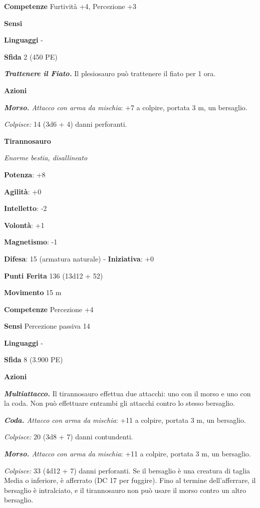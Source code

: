 \begin{multicols}{2}
\textbf{Competenze} Furtività +4, Percezione +3

\textbf{Sensi} 

\textbf{Linguaggi} -

\textbf{Sfida} 2 (450 PE)

\emph{\textbf{Trattenere il Fiato.}} Il plesiosauro può trattenere il
fiato per 1 ora.

\textbf{Azioni}

\emph{\textbf{Morso.} Attacco con arma da mischia}: +7 a colpire,
portata 3 m, un bersaglio.

\emph{Colpisce:} 14 (3d6 + 4) danni perforanti.

\textbf{Tirannosauro}

\emph{Enorme bestia, disallineato}

\textbf{Potenza}: +8

\textbf{Agilità}: +0

\textbf{Intelletto}: -2

\textbf{Volontà}: +1

\textbf{Magnetismo}: -1

\textbf{Difesa}: 15 (armatura naturale) - \textbf{Iniziativa}: +0

\textbf{Punti Ferita} 136 (13d12 + 52)

\textbf{Movimento} 15 m

\textbf{Competenze} Percezione +4

\textbf{Sensi} Percezione passiva 14

\textbf{Linguaggi} -

\textbf{Sfida} 8 (3.900 PE)

\textbf{Azioni}

\emph{\textbf{Multiattacco.}} Il tirannosauro effettua due attacchi: uno
con il morso e uno con la coda. Non può effettuare entrambi gli attacchi
contro lo stesso bersaglio.

\emph{\textbf{Coda.} Attacco con arma da mischia}: +11 a colpire,
portata 3 m, un bersaglio.

\emph{Colpisce:} 20 (3d8 + 7) danni contundenti.

\emph{\textbf{Morso.} Attacco con arma da mischia}: +11 a colpire,
portata 3 m, un bersaglio.

\emph{Colpisce:} 33 (4d12 + 7) danni perforanti. Se il bersaglio è una
creatura di taglia Media o inferiore, è afferrato (DC 17 per fuggire).
Fino al termine dell'afferrare, il bersaglio è intralciato, e il
tirannosauro non può usare il morso contro un altro bersaglio.


\end{multicols}

